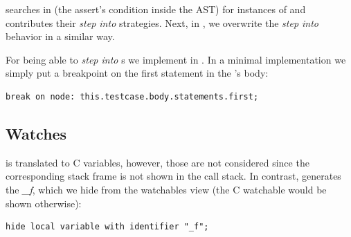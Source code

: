  searches in  (the assert's condition inside
the \ac{AST}) for instances of  and contributes their 
\emph{step into} strategies. Next, in , we overwrite
the \emph{step into} behavior in a similar way.

For being able to \emph{step into} s we implement
 in . In a minimal implementation we simply put
a breakpoint on the first statement in the 's body:
\begin{lstlisting}[language=debuggerDSL,frame=single]
break on node: this.testcase.body.statements.first;
\end{lstlisting}

\subsection{Watches}  is translated to C 
variables, however, those are not considered since the
corresponding stack frame is not shown in the call stack. In
contrast,  generates the 
\emph{\_f}, which we hide from
the watchables view (the C watchable would be shown otherwise):

\begin{lstlisting}[frame=single,language=debuggerDSL]
hide local variable with identifier "_f";
\end{lstlisting}